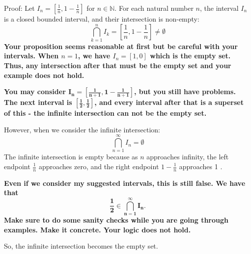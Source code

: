 \documentclass{report}
\begin{document}

Proof: Let $I_n=\left[\frac{1}{n}, 1-\frac{1}{n}\right]$ for $n \in \mathbb{N}$.
For each natural number $n$, the interval $I_n$ is a closed bounded interval, and their intersection is non-empty:
$$
\bigcap_{k=1}^n I_k=\left[\frac{1}{n}, 1-\frac{1}{n}\right] \neq \emptyset
$$
\textbf{
  Your proposition seems reasonable at first but be careful with your intervals.  When $n=1$, we have $I_n = \left[1,0 \right]$ which is the empty set. Thus, any intersection after that must be the empty set and your example does not hold.}
  \par
  \textbf{You may consider $\mathbf{I_n=\left[\frac{1}{n+1}, 1-\frac{1}{n+1} \right]}$, but you still have problems. The next interval is $\mathbf{\left[\frac{1}{2}, \frac{1}{2}\right]}$, and every interval after that is a superset of this - the infinite intersection can not be the empty set.
}
\par\bigskip
However, when we consider the infinite intersection:
$$
\bigcap_{n=1}^{\infty} I_n=\emptyset
$$
The infinite intersection is empty because as $n$ approaches infinity, the left endpoint $\frac{1}{n}$ approaches zero, and the right endpoint $1-\frac{1}{n}$ approaches 1 . 

\par
\textbf{
Even if we consider my suggested intervals, this is still false. We have that  $$\mathbf{ \frac{1}{2} \in  \bigcap_{n=1}^{\infty} I_n}.$$ Make sure to do some sanity checks while you are going through examples. Make it concrete. Your logic does not hold. 
}

So, the infinite intersection becomes the empty set.
\end{document}
